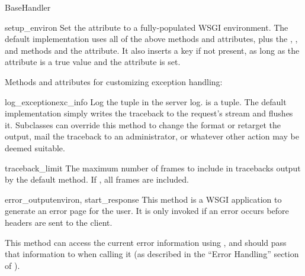 \begin{classdesc}{BaseHandler}{}
\begin{methoddesc}{setup_environ}{}
Set the  attribute to a fully-populated WSGI
environment.  The default implementation uses all of the above methods
and attributes, plus the , ,
and  methods and the 
attribute.  It also inserts a  key if not present,
as long as the  attribute is a true value and the
 attribute is set.
\end{methoddesc}

























Methods and attributes for customizing exception handling:

\begin{methoddesc}{log_exception}{exc_info}
Log the  tuple in the server log.   is a
 tuple.  The default
implementation simply writes the traceback to the request's
 stream and flushes it.  Subclasses can override this
method to change the format or retarget the output, mail the traceback
to an administrator, or whatever other action may be deemed suitable.
\end{methoddesc}

\begin{memberdesc}{traceback_limit}
The maximum number of frames to include in tracebacks output by the
default  method.  If , all frames
are included.
\end{memberdesc}

\begin{methoddesc}{error_output}{environ, start_response}
This method is a WSGI application to generate an error page for the
user.  It is only invoked if an error occurs before headers are sent
to the client.

This method can access the current error information using
, and should pass that information to
 when calling it (as described in the ``Error
Handling'' section of ).


\end{methoddesc}
\end{classdesc}
